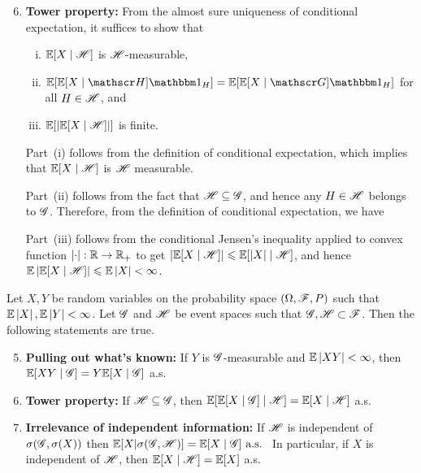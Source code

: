 \documentclass[12pt,aspectratio=169]{beamer}
\begin{document}
\begin{frame}
\begin{Proof}
\begin{enumerate}
\setcounter{enumi}{5}
\item \textbf{Tower property:} 
From the almost sure uniqueness of conditional expectation, 
it suffices to show that 
\begin{enumerate}[(i)]
\item $\mathbb{E}[X\mid\mathscr{H}]$ is $\mathscr{H}$-measurable, 
\item $\E[\E[X\mid\sH]\Ind{H}] = \E[\E[X\mid\sG]\Ind{H}]$ for all $H\in\mathscr{H}$, and 
\item $\mathbb{E}[\left\lvert\mathbb{E}[X\mid\mathscr{H}]\right\rvert]$ is finite.  
\end{enumerate}
Part~(i) follows from the definition of conditional expectation, 
which implies that $\mathbb{E}[X\mid \mathscr{H}]$ is $\mathscr{H}$ measurable. 

Part~(ii) follows from the fact that $\mathscr{H} \subseteq \mathscr{G}$, 
and hence any $H \in \mathscr{H}$ belongs to $\mathscr{G}$. 
Therefore, from the definition of conditional expectation, we have 

Part~(iii) follows from the conditional Jensen's inequality applied to convex function $\left\lvert\cdot\right\rvert:\mathbb{R}\to\mathbb{R}_+$ to get $\left\lvert\mathbb{E}[X\mid\mathscr{H}]\right\rvert \leqslant \mathbb{E}[\left\lvert X\right\rvert\mid\mathscr{H}]$, 
and hence $\mathbb{E}\left\lvert\mathbb{E}[X\mid\mathscr{H}]\right\rvert \leqslant \mathbb{E}\left\lvert X\right\rvert < \infty$. 
\end{enumerate}
\end{Proof}
\end{frame}


\begin{frame}
\begin{prop} 
Let $X,Y$ be random variables on the probability space $(\Omega, \mathscr{F}, P)$ such that $\mathbb{E}\left\lvert X\right\rvert , \mathbb{E}\left\lvert Y\right\rvert < \infty$. 
Let $\mathscr{G}$ and $\mathscr{H}$ be event spaces such that $\mathscr{G}, \mathscr{H} \subset \mathscr{F}$. 
Then the following statements are true. 
\begin{enumerate}
\setcounter{enumi}{4}
\item \textbf{Pulling out what's known:} If $Y$ is $\mathscr{G}$-measurable and $\mathbb{E}\left\lvert XY\right\rvert <\infty$, then
$\mathbb{E}[XY\mid \mathscr{G}] = Y\mathbb{E}[X\mid\mathscr{G}]$ a.s.
\item \textbf{Tower property:} If $\mathscr{H} \subseteq \mathscr{G}$, then
$\mathbb{E}[\mathbb{E}[X\mid\mathscr{G}]\mid \mathscr{H}] = \mathbb{E}[X\mid \mathscr{H}]$ a.s.
\item \textbf{Irrelevance of independent information:} If $\mathscr{H}$ is independent of $\sigma (\mathscr{G}, \sigma (X))$
then
$\mathbb{E}[X|\sigma (\mathscr{G}, \mathscr{H})] = \mathbb{E}[X\mid\mathscr{G}] \text{ a.s. }$
In particular, if $X$ is independent of $\mathscr{H}$, then $\mathbb{E}[X\mid \mathscr{H}] = \mathbb{E}[X]$ a.s.
\end{enumerate}
\end{prop}
\end{frame}
\end{document}
